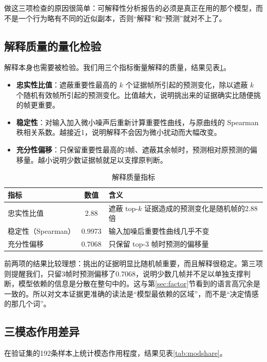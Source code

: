 做这三项检查的原因很简单：可解释性分析报告的必须是真正在用的那个模型，而不是一个行为略有不同的近似副本，否则“解释”和“预测”就对不上了。

\subsection{解释质量的量化检验}

解释本身也需要被检验。我们用三个指标衡量解释的质量，结果见表\ref{tab:xaiquality}。
\begin{itemize}
\item \textbf{忠实性比值}：遮蔽重要性最高的 $k$ 个证据帧所引起的预测变化，除以遮蔽 $k$ 个随机有效帧所引起的预测变化。比值越大，说明挑出来的证据确实比随便挑的帧更重要。
\item \textbf{稳定性}：对输入加入微小噪声后重新计算重要性曲线，与原曲线的 Spearman 秩相关系数。越接近1，说明解释不会因为微小扰动而大幅改变。
\item \textbf{充分性偏移}：只保留重要性最高的3帧、遮蔽其余帧时，预测相对原预测的偏移量。越小说明少数证据帧就足以支撑原判断。
\end{itemize}

\begin{table}[htbp]
\centering
\caption{解释质量指标}
\label{tab:xaiquality}
\begin{tabularx}{\textwidth}{lcX}
\toprule
指标 & 数值 & 含义 \\
\midrule
忠实性比值 & 2.88 & 遮蔽 top-$k$ 证据造成的预测变化是随机帧的2.88倍 \\
稳定性（Spearman） & 0.9973 & 输入加噪后重要性曲线几乎不变 \\
充分性偏移 & 0.7068 & 只保留 top-3 帧时预测的偏移量 \\
\bottomrule
\end{tabularx}
\end{table}

前两项的结果比较理想：挑出的证据明显比随机帧重要，而且解释很稳定。第三项则提醒我们，只留3帧时预测偏移了0.7068，说明少数几帧并不足以单独支撑判断，模型依赖的信息是分散在整句中的。这与第\ref{sec:factor}节看到的语言高冗余是一致的。所以对文本证据更准确的读法是“模型最依赖的区域”，而不是“决定情感的那几个词”。

\subsection{三模态作用差异}

在验证集的192条样本上统计模态作用程度，结果见表\ref{tab:modshare}。

